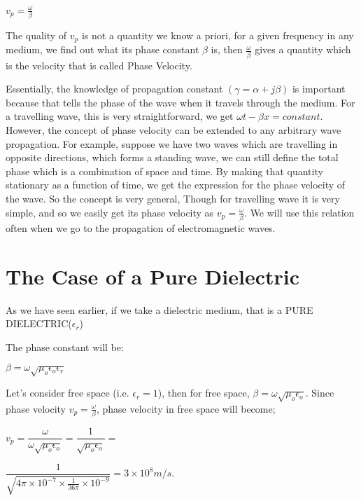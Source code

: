 \begin{center}
$ v_p=\frac{\omega}{\beta} $
\end{center}

The quality of $ v_p $ is not a quantity we know a priori, for a given frequency in any medium, we find out what its phase constant $\beta  $ is, then $\frac{\omega}{\beta}$ gives a quantity which is the velocity that is called Phase Velocity.

Essentially, the knowledge of propagation constant $(\gamma=\alpha+j\beta)$ is important because that tells the phase of the wave when it travels through the medium.
For a travelling wave, this is very straightforward, we get $ \omega t-\beta x=constant $. However, the concept of phase velocity can be extended to any arbitrary wave propagation. For example, suppose we have two waves which are travelling in opposite directions, which forms a standing wave, we can still define the total phase which is a combination of space and time. By making that quantity stationary as a function of time, we get the expression for the phase velocity of the wave. So the concept is very general, Though for travelling wave it is very simple, and so we easily get its phase velocity as $v_p=\frac{\omega}{\beta}.$ We will use this relation often when we go to the propagation of electromagnetic waves.\newline

\section{\textbf{The Case of a Pure Dielectric}}

As we have seen earlier, if we take a dielectric medium, that is a PURE DIELECTRIC($\epsilon_{r}$)

The phase constant will be:

\begin{center}
$\beta=\omega\sqrt{\mu_{o}\epsilon_{o}\epsilon_{r}}$ 
\end{center}

Let's consider free space (i.e. $\epsilon_{r}=1 $), then for free space, $\beta=\omega\sqrt{\mu_{o}\epsilon_{o}}$.
Since phase velocity $v_p=\frac{\omega}{\beta}$, phase velocity in free space will become;

$v_p=\dfrac{\omega}{\omega\sqrt{\mu_{o}\epsilon_{o}}}=\dfrac{1}{\sqrt{\mu_{o}\epsilon_{o}}}=$ 

$\dfrac{1}{\sqrt{4\pi\times 10^{-7}\times \frac{1}{36\pi}\times 10^{-9}}}=3\times 10^{8}m/s.$

